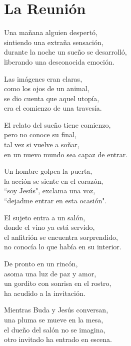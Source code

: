 \section*{La Reunión}
\label{LaReunion}

\vspace{1em}
\begin{center}
Una mañana alguien despertó,\\ 
sintiendo  una extraña sensación,\\ 
durante la noche un sueño se desarrolló,\\ 
liberando una desconocida emoción.

\vspace{1em} 
Las imágenes eran claras,\\ 
como los ojos de un animal,\\ 
se dio cuenta que aquel utopía,\\ 
era el comienzo de una travesía.

\vspace{1em} 
El relato del sueño tiene comienzo,\\ 
pero no conoce su final,\\ 
tal vez si vuelve a soñar,\\ 
en un nuevo mundo sea capaz de entrar.

\vspace{1em} 
Un hombre golpea la puerta,\\ 
la acción se siente en el corazón,\\ 
``soy Jesús", exclama una voz,\\ 
``dejadme entrar en esta ocasión".

\vspace{1em} 
El sujeto entra a un salón,\\ 
donde el vino ya está servido,\\ 
el anfitrión se encuentra sorprendido,\\ 
no conocía lo que había en su interior.

\vspace{1em} 
De pronto en un rincón,\\ 
asoma una luz de paz y amor,\\ 
un gordito con sonrisa en el rostro,\\ 
ha acudido a la invitación.

\vspace{1em} 
Mientras Buda y Jesús conversan,\\ 
una pluma se mueve en la mesa,\\ 
el dueño del salón no se imagina,\\ 
otro invitado ha entrado en escena.


\end{center}
